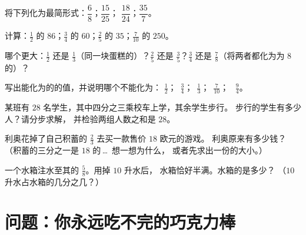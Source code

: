 \begin{exercise}[$\star$]\label{exo:g6:fractions:6}
将下列化为最简形式：$\dfrac{6}{8}$；\quad $\dfrac{15}{25}$；
\quad $\dfrac{18}{24}$；\quad $\dfrac{35}{7}$。
\end{exercise}

\begin{exercise}[$\star$]\label{exo:g6:fractions:7}
计算：$\frac12$ 的 $86$；\quad $\frac34$ 的 $60$；\quad $\frac25$ 的
$35$；\quad $\frac{7}{10}$ 的 $250$。
\end{exercise}

\begin{exercise}[$\star$]\label{exo:g6:fractions:8}
哪个更大：$\frac12$ 还是 $\frac13$（同一块蛋糕的）？$\frac25$
还是 $\frac35$？$\frac34$ 还是 $\frac78$（将两者都化为为
$8$ 的）？
\end{exercise}

\begin{exercise}[$\star\star$]\label{exo:g6:fractions:9}
  写出能化为的的值，并说明哪个不能化为：
$\frac12$；\ $\frac34$；\ $\frac13$；\ $\frac{7}{10}$；
\ $\frac{9}{4}$。
\end{exercise}

\begin{exercise}[$\star\star$]\label{exo:g6:fractions:10}
某班有 $28$ 名学生，其中四分之三乘校车上学，其余学生步行。
步行的学生有多少人？请分步求解，
并检验两组人数之和是 $28$。
\end{exercise}

\begin{exercise}[$\star\star$]\label{exo:g6:fractions:11}
利奥花掉了自己积蓄的 $\frac23$ 去买一款售价 $18$ 欧元的游戏。
利奥原来有多少钱？（积蓄的三分之一是 $18$ 的\,\dots\ 想一想为什么，
或者先求出一份的大小。）
\end{exercise}

\begin{exercise}[$\star\star\star$]\label{exo:g6:fractions:12}
一个水箱注水至其的 $\frac58$。用掉 $10$ 升水后，
水箱恰好半满。水箱的是多少？
（$10$ 升水占水箱的几分之几？）
\end{exercise}

\section{问题：你永远吃不完的巧克力棒}

